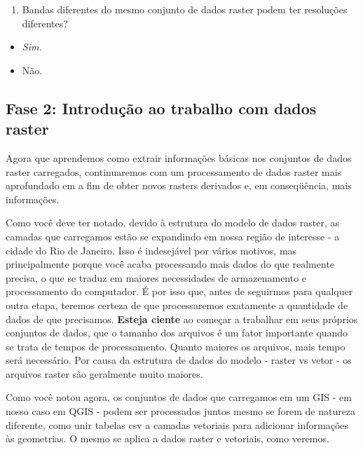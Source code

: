 \documentclass[
]{book}
\providecommand{\tightlist}{%
  \setlength{\itemsep}{0pt}\setlength{\parskip}{0pt}}
\begin{document}
\begin{enumerate}
\def\labelenumi{\arabic{enumi}.}
\setcounter{enumi}{2}
\tightlist
\item
  Bandas diferentes do mesmo conjunto de dados raster podem ter resoluções diferentes?
\end{enumerate}

\begin{itemize}
\tightlist
\item
  \emph{Sim.}
\item
  Não.
\end{itemize}

\hypertarget{fase-2-introduuxe7uxe3o-ao-trabalho-com-dados-raster}{%
\subsection{Fase 2: Introdução ao trabalho com dados raster}\label{fase-2-introduuxe7uxe3o-ao-trabalho-com-dados-raster}}

Agora que aprendemos como extrair informações básicas nos conjuntos de dados raster carregados, continuaremos com um processamento de dados raster mais aprofundado em a fim de obter novos rasters derivados e, em conseqüência, mais informações.

Como você deve ter notado, devido à estrutura do modelo de dados raster, as camadas que carregamos estão se expandindo em nossa região de interesse - a cidade do Rio de Janeiro. Isso é indesejável por vários motivos, mas principalmente porque você acaba processando mais dados do que realmente precisa, o que se traduz em maiores necessidades de armazenamento e processamento do computador. É por isso que, antes de seguirmos para qualquer outra etapa, teremos certeza de que processaremos exatamente a quantidade de dados de que precisamos. \textbf{Esteja ciente} ao começar a trabalhar em seus próprios conjuntos de dados, que o tamanho dos arquivos é um fator importante quando se trata de tempos de processamento. Quanto maiores os arquivos, mais tempo será necessário. Por causa da estrutura de dados do modelo - raster vs vetor - os arquivos raster são geralmente muito maiores.

Como você notou agora, os conjuntos de dados que carregamos em um GIS - em nosso caso em QGIS - podem ser processados \hspace{0pt}\hspace{0pt}juntos mesmo se forem de natureza diferente, como unir tabelas csv a camadas vetoriais para adicionar informações às geometrias. O mesmo se aplica a dados raster e vetoriais, como veremos.
\end{document}
